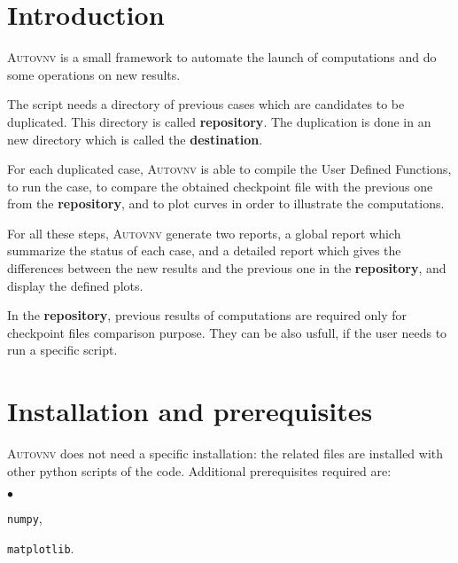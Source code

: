 \documentclass[a4paper,10pt,twoside]{article}
\begin{document}
\def\contentsname{\textbf{\normalsize TABLE OF CONTENTS}\pdfbookmark[1]{Table of
contents}{contents}}

\large
\makepdgCS
\normalsize

\passepage

\begin{center}\begin{singlespace}
\tableofcontents
\end{singlespace}\end{center}
%
\section{Introduction}

\textsc{Autovnv} is a small framework to automate the launch of \CS computations
and do some operations on new results.

The script needs a directory of previous \CS cases which are candidates to be duplicated.
This directory is called \textbf{repository}. The duplication is done in an new directory
which is called the \textbf{destination}.

For each duplicated case, \textsc{Autovnv} is able to compile the User Defined Functions,
to run the case, to compare the obtained checkpoint file with the previous one
from the \textbf{repository}, and to plot curves in order to illustrate the computations.

For all these steps, \textsc{Autovnv} generate two reports, a global report which summarize
the status of each case, and a detailed report which gives the differences between the new results
and the previous one in the \textbf{repository}, and display the defined plots.

In the \textbf{repository}, previous results of computations are required only for checkpoint
files comparison purpose. They can be also usfull, if the user needs to run a specific script.

\section{Installation and prerequisites}

\textsc{Autovnv} does not need a specific installation: the related files are installed
with other python scripts of the code. Additional prerequisites required are:
\begin{list}{$\bullet$}{}
\item \texttt{numpy},
\item \texttt{matplotlib}.
\end{list}
\end{document}
